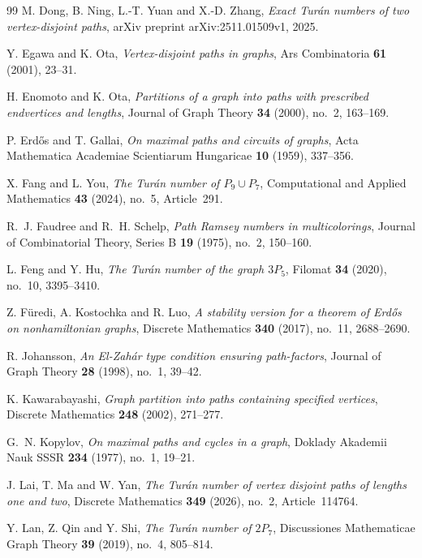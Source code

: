 \documentclass[10pt]{article}
\theoremstyle{compactplain}
\theoremstyle{remark}\newtheorem{remark}[theorem]{Remark}
\begin{document}
\begin{thebibliography}{99}
M. Dong, B. Ning, L.-T. Yuan and X.-D. Zhang,
\emph{Exact Tur\'an numbers of two vertex-disjoint paths},
arXiv preprint arXiv:2511.01509v1, 2025.

Y. Egawa and K. Ota,
\emph{Vertex-disjoint paths in graphs},
Ars Combinatoria \textbf{61} (2001), 23--31.

H. Enomoto and K. Ota,
\emph{Partitions of a graph into paths with prescribed endvertices and lengths},
Journal of Graph Theory \textbf{34} (2000), no.~2, 163--169.

P. Erd\H{o}s and T. Gallai,
\emph{On maximal paths and circuits of graphs},
Acta Mathematica Academiae Scientiarum Hungaricae \textbf{10} (1959),
337--356.

X. Fang and L. You,
\emph{The Tur\'an number of $P_9\cup P_7$},
Computational and Applied Mathematics \textbf{43} (2024), no.~5,
Article~291.

R.~J. Faudree and R.~H. Schelp,
\emph{Path Ramsey numbers in multicolorings},
Journal of Combinatorial Theory, Series B \textbf{19} (1975), no.~2,
150--160.

L. Feng and Y. Hu,
\emph{The Tur\'an number of the graph $3P_5$},
Filomat \textbf{34} (2020), no.~10, 3395--3410.

Z. F\"uredi, A. Kostochka and R. Luo,
\emph{A stability version for a theorem of Erd\H{o}s on nonhamiltonian graphs},
Discrete Mathematics \textbf{340} (2017), no.~11, 2688--2690.

R. Johansson,
\emph{An El-Zah\'ar type condition ensuring path-factors},
Journal of Graph Theory \textbf{28} (1998), no.~1, 39--42.

K. Kawarabayashi,
\emph{Graph partition into paths containing specified vertices},
Discrete Mathematics \textbf{248} (2002), 271--277.

G.~N. Kopylov,
\emph{On maximal paths and cycles in a graph},
Doklady Akademii Nauk SSSR \textbf{234} (1977), no.~1, 19--21.

J. Lai, T. Ma and W. Yan,
\emph{The Tur\'an number of vertex disjoint paths of lengths one and two},
Discrete Mathematics \textbf{349} (2026), no.~2, Article~114764.

Y. Lan, Z. Qin and Y. Shi,
\emph{The Tur\'an number of $2P_7$},
Discussiones Mathematicae Graph Theory \textbf{39} (2019), no.~4,
805--814.


\end{thebibliography}
\end{document}
